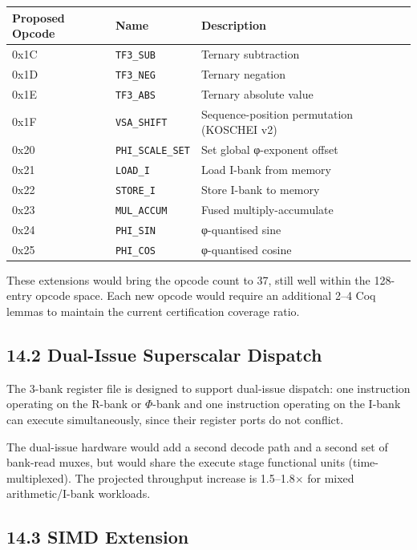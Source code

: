 \begin{longtable}[]{@{}llp{6cm}@{}}
\toprule\noalign{}
Proposed Opcode & Name & Description \\
\midrule\noalign{}
\endhead
\bottomrule\noalign{}
\endlastfoot
0x1C & \texttt{TF3\_SUB} & Ternary subtraction \\
0x1D & \texttt{TF3\_NEG} & Ternary negation \\
0x1E & \texttt{TF3\_ABS} & Ternary absolute value \\
0x1F & \texttt{VSA\_SHIFT} & Sequence-position permutation (KOSCHEI v2) \\
0x20 & \texttt{PHI\_SCALE\_SET} & Set global φ-exponent offset \\
0x21 & \texttt{LOAD\_I} & Load I-bank from memory \\
0x22 & \texttt{STORE\_I} & Store I-bank to memory \\
0x23 & \texttt{MUL\_ACCUM} & Fused multiply-accumulate \\
0x24 & \texttt{PHI\_SIN} & φ-quantised sine \\
0x25 & \texttt{PHI\_COS} & φ-quantised cosine \\
\end{longtable}

These extensions would bring the opcode count to 37, still well
within the 128-entry opcode space. Each new opcode would require
an additional 2--4 Coq lemmas to maintain the current certification
coverage ratio.

\subsection{14.2 Dual-Issue Superscalar Dispatch}\label{fa_71:dual-issue}

The 3-bank register file is designed to support dual-issue
dispatch: one instruction operating on the R-bank or $\Phi$-bank
and one instruction operating on the I-bank can execute
simultaneously, since their register ports do not conflict.

The dual-issue hardware would add a second decode path and a
second set of bank-read muxes, but would share the execute stage
functional units (time-multiplexed). The projected throughput
increase is 1.5--1.8$\times$ for mixed arithmetic/I-bank
workloads.

\subsection{14.3 SIMD Extension}\label{fa_71:simd}

